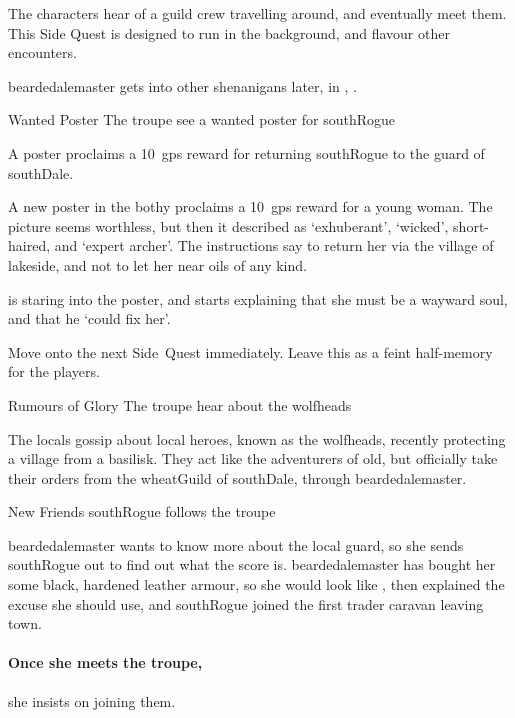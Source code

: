 \label{wolfHeads}

\noindent
The characters hear of a guild crew travelling around, and eventually meet them.
This Side Quest is designed to run in the background, and flavour other encounters.

\Gls{beardedalemaster} gets into other shenanigans later, in , .

{\squash Wanted Poster}%
{The troupe see a wanted poster for \gls{southRogue}}%

A poster proclaims a 10~\glspl{gp} reward for returning \gls{southRogue} to the \gls{guard} of \gls{southDale}.

\begin{boxtext}
  A new poster in the \gls{bothy} proclaims a 10~\glspl{gp} reward for a young woman.
  The picture seems worthless, but then it described as `exhuberant', `wicked', short-haired, and `expert archer'.
  The instructions say to return her via the \gls{village} of \gls{lakeside}, and not to let her near oils of any kind.

   is staring into the poster, and starts explaining that she must be a wayward soul, and that he `could fix her'.
\end{boxtext}

Move onto the next Side~Quest immediately.
Leave this as a feint half-memory for the players.

{\squash Rumours of Glory}%
{The troupe hear about the \glspl{wolfhead}}%

The locals gossip about local heroes, known as the \glspl{wolfhead}, recently protecting a \gls{village} from a basilisk.
They act like the adventurers of old, but officially take their orders from the \gls{wheatGuild} of \gls{southDale}, through \gls{beardedalemaster}.

{New Friends}%
{\Gls{southRogue} follows the troupe}%

\Gls{beardedalemaster} wants to know more about the local \gls{guard}, so she sends \gls{southRogue} out to find out what the score is.
\Gls{beardedalemaster} has bought her some black, hardened leather armour, so she would look like , then explained the excuse she should use, and \gls{southRogue} joined the first trader caravan leaving \gls{town}.

\paragraph{Once she meets the troupe,}
she insists on joining them.

